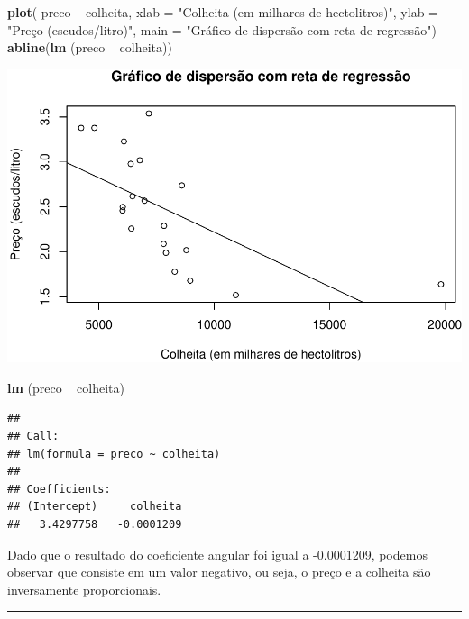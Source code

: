 \documentclass[11pt,]{article}
\makeatletter
\newenvironment{Shaded}{\begin{snugshade}}{\end{snugshade}}
\newcommand{\KeywordTok}[1]{\textcolor[rgb]{0.13,0.29,0.53}{\textbf{{#1}}}}
\newcommand{\DataTypeTok}[1]{\textcolor[rgb]{0.13,0.29,0.53}{{#1}}}
\newcommand{\StringTok}[1]{\textcolor[rgb]{0.31,0.60,0.02}{{#1}}}
\newcommand{\NormalTok}[1]{{#1}}
\def\maxwidth{\ifdim\Gin@nat@width>\linewidth\linewidth
\else\Gin@nat@width\fi}
\let\Oldincludegraphics\includegraphics
\renewcommand{\includegraphics}[1]{\Oldincludegraphics[width=\maxwidth]{#1}}
\makeatother
\begin{document}
\begin{Shaded}
\begin{Highlighting}[]
\KeywordTok{plot}\NormalTok{( preco ~}\StringTok{ }\NormalTok{colheita, }
      \DataTypeTok{xlab =} \StringTok{"Colheita (em milhares de hectolitros)"}\NormalTok{,}
      \DataTypeTok{ylab =} \StringTok{"Preço (escudos/litro)"}\NormalTok{,}
      \DataTypeTok{main =} \StringTok{"Gráfico de dispersão com reta de regressão"}\NormalTok{)}
\KeywordTok{abline}\NormalTok{(}\KeywordTok{lm} \NormalTok{(preco ~}\StringTok{ }\NormalTok{colheita))}
\end{Highlighting}
\end{Shaded}

\includegraphics{versaofinal_lista3_files/figure-latex/unnamed-chunk-3-1.pdf}

\begin{Shaded}
\begin{Highlighting}[]
\KeywordTok{lm} \NormalTok{(preco ~}\StringTok{ }\NormalTok{colheita)}
\end{Highlighting}
\end{Shaded}

\begin{verbatim}
## 
## Call:
## lm(formula = preco ~ colheita)
## 
## Coefficients:
## (Intercept)     colheita  
##   3.4297758   -0.0001209
\end{verbatim}

Dado que o resultado do coeficiente angular foi igual a -0.0001209,
podemos observar que consiste em um valor negativo, ou seja, o preço e a
colheita são inversamente proporcionais.

\begin{center}\rule{0.5\linewidth}{\linethickness}\end{center}
\end{document}
